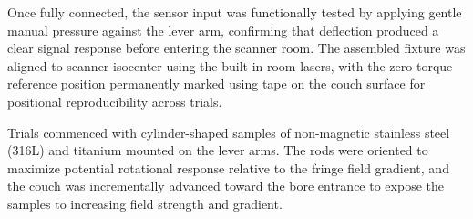 Once fully connected, the sensor input was functionally tested by applying gentle manual pressure against the lever arm, confirming that deflection produced a clear signal response before entering the scanner room. The assembled fixture was aligned to scanner isocenter using the built-in room lasers, with the zero-torque reference position permanently marked using tape on the couch surface for positional reproducibility across trials.

Trials commenced with cylinder-shaped samples of non-magnetic stainless steel (316L) and titanium mounted on the lever arms. The rods were oriented to maximize potential rotational response relative to the fringe field gradient, and the couch was incrementally advanced toward the bore entrance to expose the samples to increasing field strength and gradient. 






